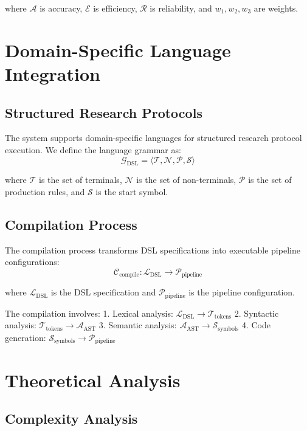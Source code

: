 \documentclass[12pt,a4paper]{article}
\begin{document}
where $\mathcal{A}$ is accuracy, $\mathcal{E}$ is efficiency, $\mathcal{R}$ is reliability, and $w_1, w_2, w_3$ are weights.

\section{Domain-Specific Language Integration}

\subsection{Structured Research Protocols}

The system supports domain-specific languages for structured research protocol execution. We define the language grammar as:
$$\mathcal{G}_{\text{DSL}} = \langle \mathcal{T}, \mathcal{N}, \mathcal{P}, \mathcal{S} \rangle$$

where $\mathcal{T}$ is the set of terminals, $\mathcal{N}$ is the set of non-terminals, $\mathcal{P}$ is the set of production rules, and $\mathcal{S}$ is the start symbol.

\subsection{Compilation Process}

The compilation process transforms DSL specifications into executable pipeline configurations:
$$\mathcal{C}_{\text{compile}}: \mathcal{L}_{\text{DSL}} \rightarrow \mathcal{P}_{\text{pipeline}}$$

where $\mathcal{L}_{\text{DSL}}$ is the DSL specification and $\mathcal{P}_{\text{pipeline}}$ is the pipeline configuration.

The compilation involves:
1. Lexical analysis: $\mathcal{L}_{\text{DSL}} \rightarrow \mathcal{T}_{\text{tokens}}$
2. Syntactic analysis: $\mathcal{T}_{\text{tokens}} \rightarrow \mathcal{A}_{\text{AST}}$
3. Semantic analysis: $\mathcal{A}_{\text{AST}} \rightarrow \mathcal{S}_{\text{symbols}}$
4. Code generation: $\mathcal{S}_{\text{symbols}} \rightarrow \mathcal{P}_{\text{pipeline}}$

\section{Theoretical Analysis}

\subsection{Complexity Analysis}
\end{document}
